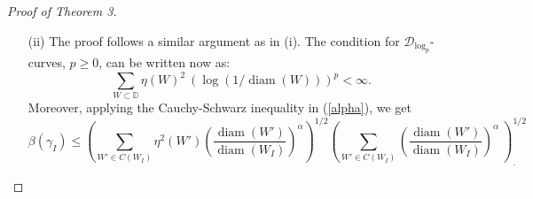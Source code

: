 \documentclass[12pt,a4paper]{article}
\theoremstyle{definition}
\theoremstyle{remark}
\newcommand{\D}{\mathbb{D}}
\newcommand{\T}{\mathbb{T}}
\newcommand{\diam}{\operatorname{diam}}
\numberwithin{komcounter}{section}
\begin{document}
\begin{proof}[Proof of Theorem 3]
\begin{itemize}
\begin{equation}\label{alpha}
\beta(\gamma_I) \lesssim \frac {\alpha(W_I) }{\diam (\gamma_I)}\lesssim \sum_{W'\in C(W_I)} \eta(W') \left(\frac{\diam(W')}{\diam (W_I)}\right)^\alpha.
\end{equation}
Choose $1/2<\alpha<1$ and $s>0$ so that  $p<s<2\alpha$. By the Cauchy-Schwarz inequality,
$$
\beta(\gamma_I)\leq \left( \sum_{W'\in C(W_I)} \eta^2 (W') \left(\frac{\diam(W')}{\diam (W_I)}\right)^s\right)^{1/2}  \left(\sum_{W'\in C(W_I)}  \left(\frac{\diam(W')}{\diam (W_I)}\right)^{2\alpha-s}~\right)^{1/2}.
$$
 Note that the last sum is a geometric sum, which is finite since $2\alpha-s>0$.	
Therefore, given a dyadic arc $J\subset\T$ of small enough diameter,
\begin{align}\nonumber
\frac{1}{| J|^p}\sum_{ I: I~\textrm{dyadic}  \subset  J} \beta^2 (\gamma_ I)~| I|^p &\lesssim \frac{1}{| J|^p}\sum_{ I: I~\textrm{dyadic}  \subset  J} \sum_{W'\in C(W_I)} \eta^2(W') \left(\frac{\diam(W')}{\diam (W_I)}\right)^s
        |I|^p\\\label{ca}
&\lesssim \frac{1}{| J|^p}
\sum_{W'\subset Q_J}\eta^2 (W') ~(\diam (W'))^s \sum_{\{I: W'\in C(W_I)\}}\frac{1}{ (\diam (W_I))^{s-p} }     
\end{align}
To estimate the last sum, observe that  $W'=T(Q_{I'})$ for some dyadic interval $I'$. If $I$ is such that  $W'\in C(W_I)$, then $I'\subset c I$ for some constant $c>0$. Since $s>p$, we get that the last sum, which is a geometric  sum, can be bounded by a multiple of $\frac{1}{ (\diam (W'))^{s-p}}$. Thus, by (\ref{ca}) and (\ref{v}), we deduce that
\begin{align}\nonumber
\frac{1}{| J|^p}\sum_{ I: I~\textrm{dyadic}  \subset  J} \beta^2 (\gamma_ I)~| I|^p& \lesssim 
\frac{1}{| J|^p}\sum_{W'\subset Q_J}\eta^2 (W') ~(\diam (W'))^p
 \to 0 ~\textrm{as} ~|J|\to 0,
\end{align}
as we wanted to show.
\item[(ii)]
The proof follows a similar argument as in (i). The condition for  $\mathcal{D}_{\log_p}$-curves, $p\geq 0$, can be written now as:
\begin{equation}\label{last}
	\sum_{W\subset  \D} \eta(W)^2 ~\left(\log \left(1/\diam(W)\right)\right)^p <\infty.
\end{equation}
Moreover, applying the Cauchy-Schwarz inequality in (\ref{alpha}), we get
$$
\beta(\gamma_I)\leq \left( \sum_{W'\in C(W_I)} \eta^2 (W') \left(\frac{\diam(W')}{\diam (W_I)}\right)^\alpha\right)^{1/2}  \left(\sum_{W'\in C(W_I)}  \left(\frac{\diam(W')}{\diam (W_I)}\right)^{\alpha}~\right)^{1/2}_.
$$
\end{itemize}
\end{proof}
\end{document}
